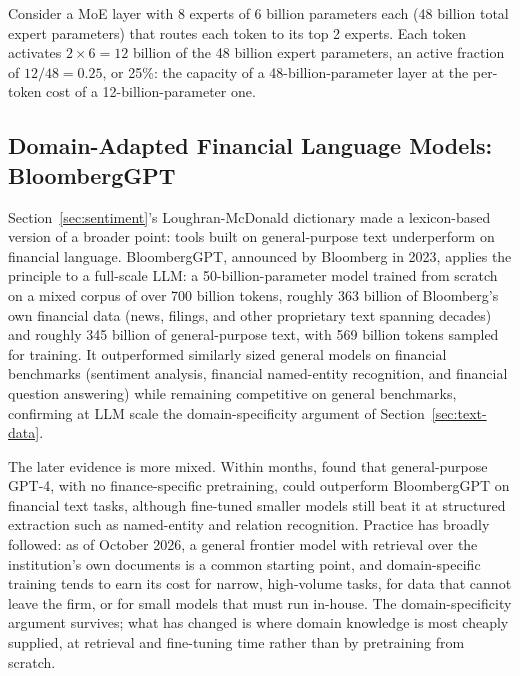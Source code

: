 \documentclass[../ai_in_finance]{subfiles}
\begin{document}
Consider a MoE layer with 8 experts of 6 billion parameters each (48 billion total expert parameters) that routes each token to its top 2 experts. Each token activates $2 \times 6 = 12$ billion of the 48 billion expert parameters, an active fraction of $12/48 = 0.25$, or 25\%: the capacity of a 48-billion-parameter layer at the per-token cost of a 12-billion-parameter one.

\subsection{Domain-Adapted Financial Language Models: BloombergGPT}
\label{sec:bloomberggpt}

Section~\ref{sec:sentiment}'s Loughran-McDonald dictionary made a lexicon-based version of a broader point: tools built on general-purpose text underperform on financial language. BloombergGPT, announced by Bloomberg in 2023, applies the principle to a full-scale LLM: a 50-billion-parameter model trained from scratch on a mixed corpus of over 700 billion tokens, roughly 363 billion of Bloomberg's own financial data (news, filings, and other proprietary text spanning decades) and roughly 345 billion of general-purpose text, with 569 billion tokens sampled for training. It outperformed similarly sized general models on financial benchmarks (sentiment analysis, financial named-entity recognition, and financial question answering) while remaining competitive on general benchmarks, confirming at LLM scale the domain-specificity argument of Section~\ref{sec:text-data}.

The later evidence is more mixed. Within months, \textcite{li2023chatgpt} found that general-purpose GPT-4, with no finance-specific pretraining, could outperform BloombergGPT on financial text tasks, although fine-tuned smaller models still beat it at structured extraction such as named-entity and relation recognition. Practice has broadly followed: as of October 2026, a general frontier model with retrieval over the institution's own documents is a common starting point, and domain-specific training tends to earn its cost for narrow, high-volume tasks, for data that cannot leave the firm, or for small models that must run in-house. The domain-specificity argument survives; what has changed is where domain knowledge is most cheaply supplied, at retrieval and fine-tuning time rather than by pretraining from scratch.
\end{document}
